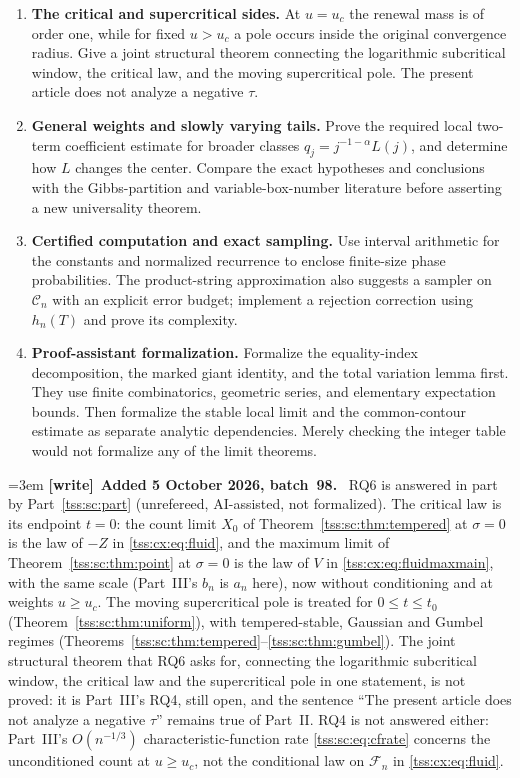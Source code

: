 \documentclass[11pt]{article}
\theoremstyle{remark}\newtheorem{remark}[theorem]{Remark}
\theoremstyle{definition}\newtheorem{definition}[theorem]{Definition}
\newcommand{\Cev}{\mathcal C_n}
\newcommand{\Fev}{\mathcal F_n}
\newenvironment{writenote}[1][]{\par\smallskip\begingroup\small\emergencystretch=3em
 \noindent\textbf{[write]}\if\relax\detokenize{#1}\relax\else~\textbf{#1.}\fi\ }%
 {\par\endgroup\smallskip}
\begin{document}
\begin{enumerate}[label=\textbf{RQ\arabic*.},leftmargin=*]
\item \textbf{The critical and supercritical sides.}
At $u=u_c$ the renewal mass is of order one, while for fixed
$u>u_c$ a pole occurs inside the original convergence radius.
Give a joint structural theorem connecting the logarithmic
subcritical window, the critical law, and the moving supercritical
pole. The present article does not analyze a negative $\tau$.

\item \textbf{General weights and slowly varying tails.}
Prove the required local two-term coefficient estimate for broader
classes $q_j=j^{-1-\alpha}L(j)$, and determine how $L$ changes the
center. Compare the exact hypotheses and conclusions with the
Gibbs-partition and variable-box-number literature before asserting
a new universality theorem.

\item \textbf{Certified computation and exact sampling.}
Use interval arithmetic for the constants and normalized recurrence
to enclose finite-size phase probabilities. The product-string
approximation also suggests a sampler on $\Cev$ with an explicit
error budget; implement a rejection correction using $h_n(T)$ and
prove its complexity.

\item \textbf{Proof-assistant formalization.}
Formalize the equality-index decomposition, the marked giant
identity, and the total variation lemma first. They use finite
combinatorics, geometric series, and elementary expectation bounds.
Then formalize the stable local limit and the common-contour
estimate as separate analytic dependencies. Merely checking the
integer table would not formalize any of the limit theorems.
\end{enumerate}

\begin{writenote}[Added 5 October 2026, batch~98]
RQ6 is answered in part by Part~\ref{tss:sc:part} (unrefereed, AI-assisted,
not formalized). The critical law is its endpoint $t=0$: the count limit
$X_0$ of Theorem~\ref{tss:sc:thm:tempered} at $\sigma=0$ is the law of $-Z$
in \eqref{tss:cx:eq:fluid}, and the maximum limit of
Theorem~\ref{tss:sc:thm:point} at $\sigma=0$ is the law of $V$ in
\eqref{tss:cx:eq:fluidmaxmain}, with the same scale (Part~III's $b_n$ is
$a_n$ here), now without conditioning and at weights $u\ge u_c$. The
moving supercritical pole is treated for $0\le t\le t_0$
(Theorem~\ref{tss:sc:thm:uniform}), with tempered-stable, Gaussian and
Gumbel regimes (Theorems~\ref{tss:sc:thm:tempered}--\ref{tss:sc:thm:gumbel}).
The joint structural theorem that RQ6 asks for, connecting the
logarithmic subcritical window, the critical law and the supercritical
pole in one statement, is not proved: it is Part~III's RQ4, still open, and
the sentence ``The present article does not analyze a negative $\tau$''
remains true of Part~II. RQ4 is not answered either: Part~III's
$O(n^{-1/3})$ characteristic-function rate \eqref{tss:sc:eq:cfrate} concerns
the unconditioned count at $u\ge u_c$, not the conditional law on $\Fev$
in \eqref{tss:cx:eq:fluid}.
\end{writenote}
\end{document}
